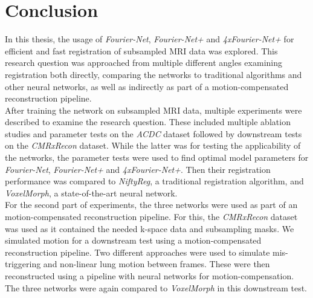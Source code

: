 
\chapter{Conclusion} \label{Ch:Conclusion}
In this thesis, the usage of \emph{Fourier-Net}, \emph{Fourier-Net+} and \emph{4xFourier-Net+} for efficient and fast registration of subsampled MRI data was explored. This research question was approached from multiple different angles examining registration both directly, comparing the networks to traditional algorithms and other neural networks, as well as indirectly as part of a motion-compensated reconstruction pipeline. \\
After training the network on subsampled MRI data, multiple experiments were described to examine the research question. These included multiple ablation studies and parameter tests on the \emph{ACDC} dataset followed by downstream tests on the \emph{CMRxRecon} dataset. While the latter was for testing the applicability of the networks, the parameter tests were used to find optimal model parameters for \emph{Fourier-Net}, \emph{Fourier-Net+} and \emph{4xFourier-Net+}. Then their registration performance was compared to \emph{NiftyReg}, a traditional registration algorithm, and \emph{VoxelMorph}, a state-of-the-art neural network.\\
For the second part of experiments, the three networks were used as part of an motion-compensated reconstruction pipeline. For this, the \emph{CMRxRecon} dataset was used as it contained the needed k-space data and subsampling masks. We simulated motion for a downstream test using a motion-compensated reconstruction pipeline. Two different approaches were used to simulate mis-triggering and non-linear lung motion between frames. These were then reconstructed using a pipeline with neural networks for motion-compensation. The three networks were again compared to \emph{VoxelMorph} in this downstream test.